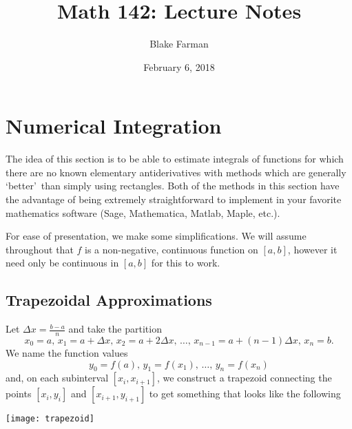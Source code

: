 \documentclass[reqno, 12pt]{amsart}
\title[Lecture Notes]{Math 142: Lecture Notes}
\author{Blake Farman}
\date{February 6, 2018}
\begin{document}
\maketitle

\section{Numerical Integration}
The idea of this section is to be able to estimate integrals of functions for which there are no known elementary antiderivatives with methods which are generally \lq better\rq\ than simply using rectangles.
Both of the methods in this section have the advantage of being extremely straightforward to implement in your favorite mathematics software (Sage, Mathematica, Matlab, Maple, etc.).

For ease of presentation, we make some simplifications.
We will assume throughout that \(f\) is a non-negative, continuous function on \([a,b]\), however it need only be continuous in \([a,b]\) for this to work.
\subsection{Trapezoidal Approximations}

Let \(\Delta x = \frac{b - a}{n}\) and take the partition
\[x_0 = a,\, x_1 = a + \Delta x,\, x_2 = a + 2\Delta x,\, \ldots,\, x_{n-1} = a + (n-1)\Delta x,\, x_n = b.\]
We name the function values
\[y_0 = f(a),\, y_1 = f(x_1),\, \ldots,\, y_n = f(x_n)\]
and, on each subinterval \([x_i, x_{i + 1}]\), we construct a trapezoid connecting the points \([x_i,y_i]\) and \([x_{i+1}, y_{i+1}]\) to get something that looks like the following
\begin{center}
  \texttt{[image: trapezoid]}
\end{center}
\end{document}
